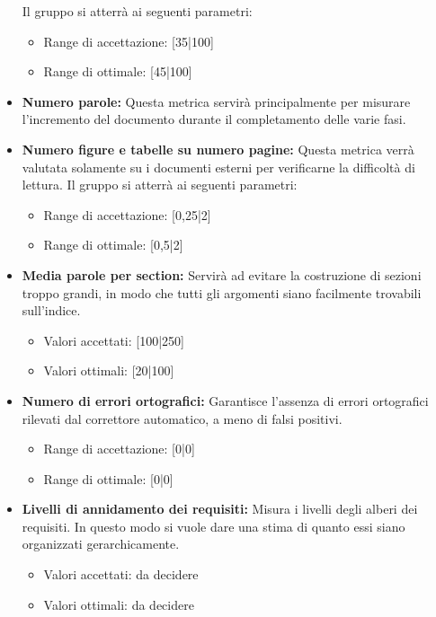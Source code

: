 \documentclass[a4paper]{article}
\begin{document}
\begin{itemize}
				Il gruppo si atterrà ai seguenti parametri:
				\begin{itemize}
					\item Range di accettazione: [35|100]
					\item Range di ottimale: [45|100]
				\end{itemize}
				\item \textbf{Numero parole:} Questa metrica servirà principalmente per misurare l'incremento del documento durante il completamento delle varie fasi.
				\item \textbf{Numero figure e tabelle su numero pagine:} Questa metrica verrà valutata solamente su i documenti esterni per verificarne la difficoltà di lettura.
				Il gruppo si atterrà ai seguenti parametri:
				\begin{itemize}
					\item Range di accettazione: [0,25|2]
					\item Range di ottimale: [0,5|2]
				\end{itemize}
				\item \textbf{Media parole per section:} Servirà ad evitare la costruzione di sezioni troppo grandi, in modo che tutti
				gli argomenti siano facilmente trovabili sull'indice.
				\begin{itemize}
					\item Valori accettati: [100|250]
					\item Valori ottimali: [20|100]
				\end{itemize}
				\item \textbf{Numero di errori ortografici:} 
				Garantisce l'assenza di errori ortografici rilevati dal correttore automatico, a meno di falsi positivi.
				\begin{itemize}
					\item Range di accettazione: [0|0]
					\item Range di ottimale: [0|0]
				\end{itemize}
				
				\item \textbf{Livelli di annidamento dei requisiti:}
				Misura i livelli degli alberi dei requisiti. In questo modo si vuole dare una stima di quanto essi
				siano organizzati gerarchicamente.
				\begin{itemize}
					\item Valori accettati: da decidere
							\item Valori ottimali: da decidere
				\end{itemize}
				
			\end{itemize}
				
\end{document}
